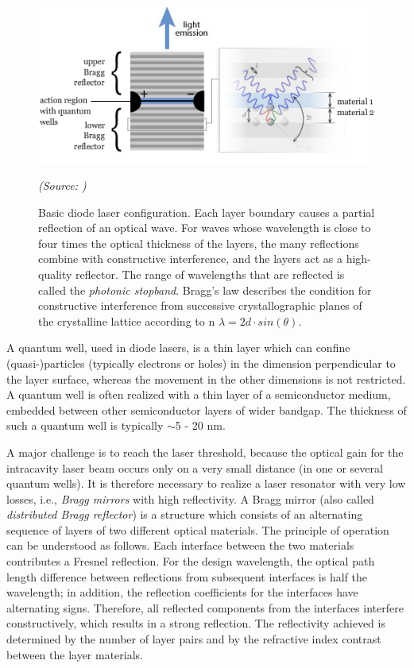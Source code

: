 \begin{figure} [ht]
\centering
\includegraphics[scale=0.6]{chapters/img/diodelaser.png}	
\caption[Basic diode laser configuration]{Basic diode laser configuration. Each layer boundary causes a partial reflection of an optical wave. For waves whose wavelength is close to four times the optical thickness of the layers, the many reflections combine with constructive interference, and the layers act as a high-quality reflector. The range of wavelengths that are reflected is called the \textit{photonic stopband}. Bragg's law describes the condition for constructive interference from successive crystallographic planes of the crystalline lattice according to n $\lambda  =2d\cdot sin(\theta)$.} \emph{(Source: \cite{laser_power})}
\label{diode_laser_configuration}
\end{figure}

A quantum well, used in diode lasers, is a thin layer which can confine (quasi-)particles (typically electrons or holes) in the dimension perpendicular to the layer surface, whereas the movement in the other dimensions is not restricted. A quantum well is often realized with a thin layer of a semiconductor medium, embedded between other semiconductor layers of wider bandgap. The thickness of such a quantum well is typically $\sim$5 - 20 nm. 

A major challenge is to reach the laser threshold, because the optical gain for the intracavity laser beam occurs only on a very small distance (in one or several quantum wells). It is therefore necessary to realize a laser resonator with very low losses, i.e., \textit{Bragg mirrors} with high reflectivity. A Bragg mirror (also called \textit{distributed Bragg reflector}) is a structure which consists of an alternating sequence of layers of two different optical materials. The principle of operation can be understood as follows. Each interface between the two materials contributes a Fresnel reflection. For the design wavelength, the optical path length difference between reflections from subsequent interfaces is half the wavelength; in addition, the reflection coefficients for the interfaces have alternating signs. Therefore, all reflected components from the interfaces interfere constructively, which results in a strong reflection. The reflectivity achieved is determined by the number of layer pairs and by the refractive index contrast between the layer materials. 

